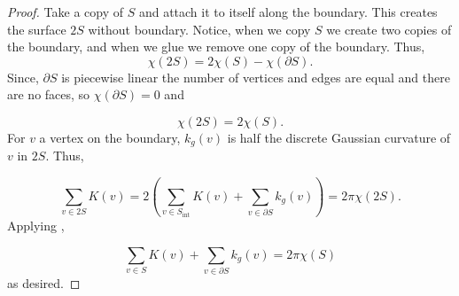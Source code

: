 \begin{proof}
Take a copy of $S$ and attach it to itself along the boundary.
This creates the surface $2S$ without boundary. Notice,
when we copy $S$ we create two copies of the boundary, and when
we glue we remove one copy of the boundary.
Thus, $$\chi(2S)=2\chi(S)-\chi(\partial S).$$
Since, $\partial S$ is piecewise linear the number of vertices and
edges are equal and there are no faces, so $\chi(\partial S)=0$
and 

\begin{equation} \label{eqn:glue}
\chi(2S)=2\chi(S).
\end{equation}
For $v$ a vertex on the boundary, $k_g(v)$ is half
the discrete Gaussian curvature of $v$ in $2S.$
Thus,

$$\sum_{v\in 2S}K(v)=2\left(\sum_{v\in S_{\text{int}}}K(v)+\sum_{v\in \partial S} k_g(v)\right) =2\pi  \chi(2S).$$
Applying ,

$$\sum_{v\in S}K(v)+\sum_{v\in \partial S} k_g(v)=2\pi  \chi(S)$$
as desired.

\end{proof}



